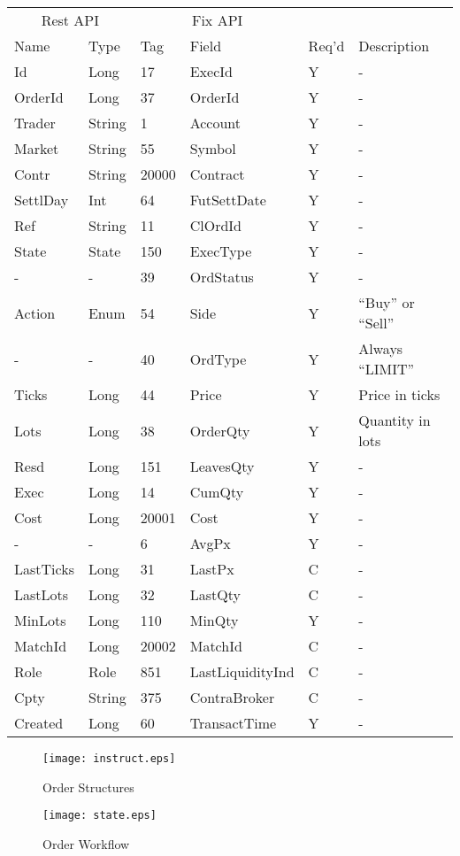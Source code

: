 \documentclass[11pt,a4paper]{article}
\begin{document}
\vspace{5mm}
\begin{tabular}{ll|ll|ll}
\multicolumn{2}{c}{Rest API}&\multicolumn{2}{c}{Fix API}\\
Name&Type&Tag&Field&Req'd&Description\\
\hline
Id&Long&17&ExecId&Y&-\\
OrderId&Long&37&OrderId&Y&-\\
Trader&String&1&Account&Y&-\\
Market&String&55&Symbol&Y&-\\
Contr&String&20000&Contract&Y&-\\
SettlDay&Int&64&FutSettDate&Y&-\\
Ref&String&11&ClOrdId&Y&-\\
State&State&150&ExecType&Y&-\\
-&-&39&OrdStatus&Y&-\\
Action&Enum&54&Side&Y&``Buy'' or ``Sell''\\
-&-&40&OrdType&Y&Always ``LIMIT''\\
Ticks&Long&44&Price&Y&Price in ticks\\
Lots&Long&38&OrderQty&Y&Quantity in lots\\
Resd&Long&151&LeavesQty&Y&-\\
Exec&Long&14&CumQty&Y&-\\
Cost&Long&20001&Cost&Y&-\\
-&-&6&AvgPx&Y&-\\
LastTicks&Long&31&LastPx&C&-\\
LastLots&Long&32&LastQty&C&-\\
MinLots&Long&110&MinQty&Y&-\\
MatchId&Long&20002&MatchId&C&-\\
Role&Role&851&LastLiquidityInd&C&-\\
Cpty&String&375&ContraBroker&C&-\\
Created&Long&60&TransactTime&Y&-\\
\end{tabular}
\vspace{5mm}

\begin{figure}[H]
\centering
\texttt{[image: instruct.eps]}
\caption{Order Structures}
\end{figure}

\begin{figure}[H]
\centering
\texttt{[image: state.eps]}
\caption{Order Workflow}
\end{figure}
\end{document}
